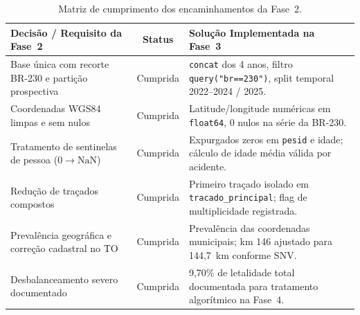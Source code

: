 \documentclass[11pt,a4paper]{article}
\begin{document}
\begin{table}[H]
  \centering
  \small
  \renewcommand{\arraystretch}{1.25}
  \caption{Matriz de cumprimento dos encaminhamentos da Fase~2.}
  \label{tab:matriz_rastreabilidade}
  \begin{tabularx}{\textwidth}{|>{\raggedright\arraybackslash}p{4.8cm}|c|L|}
    \hline
    \textbf{Decisão / Requisito da Fase~2} & \textbf{Status} & \textbf{Solução Implementada na Fase~3} \\
    \hline
    Base única com recorte BR-230 e partição prospectiva & Cumprida & \texttt{concat} dos 4 anos, filtro \texttt{query("br==230")}, split temporal 2022--2024 / 2025. \\
    \hline
    Coordenadas WGS84 limpas e sem nulos & Cumprida & Latitude/longitude numéricas em \texttt{float64}, 0 nulos na série da BR-230. \\
    \hline
    Tratamento de sentinelas de pessoa ($0 \rightarrow \text{NaN}$) & Cumprida & Expurgados zeros em \texttt{pesid} e idade; cálculo de idade média válida por acidente. \\
    \hline
    Redução de traçados compostos & Cumprida & Primeiro traçado isolado em \texttt{tracado\_principal}; flag de multiplicidade registrada. \\
    \hline
    Prevalência geográfica e correção cadastral no TO & Cumprida & Prevalência das coordenadas municipais; km 146 ajustado para 144,7~km conforme SNV. \\
    \hline
    Desbalanceamento severo documentado & Cumprida & 9,70\% de letalidade total documentada para tratamento algorítmico na Fase~4. \\
    \hline
  \end{tabularx}
\end{table}

\newpage


\end{document}

